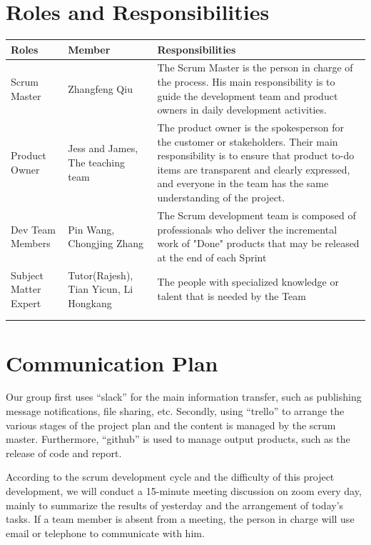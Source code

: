 \documentclass{report}
\begin{document}
\section{Roles and Responsibilities}
\begin{tabularx}{0.95\linewidth}{%
  l%
  >{\raggedright\arraybackslash}p{2.2cm}%
  >{\raggedright\arraybackslash}X}
  \toprule
  Roles & Member & Responsibilities \\
  \midrule
  Scrum Master
  & Zhangfeng Qiu
  & The Scrum Master is the person in charge of the process. His main responsibility is to guide the development team and product owners in daily development activities.
  \\
  \midrule
  Product Owner
  & Jess and James, The teaching team
  & The product owner is the spokesperson for the customer or stakeholders. Their main responsibility is to ensure that product to-do items are transparent and clearly expressed, and everyone in the team has the same understanding of the project.
  \\
  \midrule
  Dev Team Members
  & Pin Wang, Chongjing Zhang
  & The Scrum development team is composed of professionals who deliver the incremental work of "Done" products that may be released at the end of each Sprint
  \\
  \midrule
  Subject Matter Expert
  & Tutor(Rajesh), Tian Yicun, Li Hongkang
  & The people with specialized knowledge or talent that is needed by the Team
  \\
  \bottomrule
  \\
  \caption{Roles and Responsibilitiest}  
  \label{tab:rolesResponsibilities}
\end{tabularx}

\section{Communication Plan}
Our group first uses “slack” for the main information transfer, such as publishing message notifications, file sharing, etc. Secondly, using “trello” to arrange the various stages of the project plan and the content is managed by the scrum master. Furthermore, “github” is used to manage output products, such as the release of code and report.

According to the scrum development cycle and the difficulty of this project development, we will conduct a 15-minute meeting discussion on zoom every day, mainly to summarize the results of yesterday and the arrangement of today's tasks. If a team member is absent from a meeting, the person in charge will use email or telephone to communicate with him.
\end{document}
